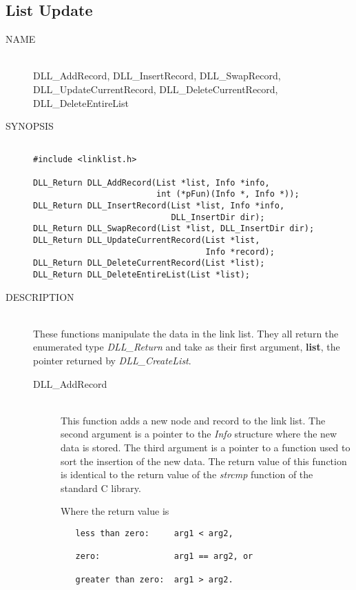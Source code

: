 \documentclass[10pt,letterpaper,titlepage]{article}
\begin{document}
\subsection{List Update}
\begin{description}
\item[NAME]\quad\\
DLL\_AddRecord, DLL\_InsertRecord, DLL\_SwapRecord,\\
DLL\_UpdateCurrentRecord, DLL\_DeleteCurrentRecord,\\
DLL\_DeleteEntireList

\item[SYNOPSIS]
\begin{verbatim}

#include <linklist.h>

DLL_Return DLL_AddRecord(List *list, Info *info,
                         int (*pFun)(Info *, Info *));
DLL_Return DLL_InsertRecord(List *list, Info *info,
                            DLL_InsertDir dir);
DLL_Return DLL_SwapRecord(List *list, DLL_InsertDir dir);
DLL_Return DLL_UpdateCurrentRecord(List *list,
                                   Info *record);
DLL_Return DLL_DeleteCurrentRecord(List *list);
DLL_Return DLL_DeleteEntireList(List *list);
\end{verbatim}

\item[DESCRIPTION]\quad\\
These functions manipulate the data in the link list.  They all return the enumerated type \emph{DLL\_Return} and take as their first argument, \textbf{list}, the pointer returned by \emph{DLL\_CreateList}.

\begin{description}
\item[DLL\_AddRecord]\quad\\
 This function adds a new node and record to the link list.  The second argument is a pointer to the \emph{Info} structure where the new data is stored.  The third argument is a pointer to a function used to sort the insertion of the new data.  The return value of this function is identical to the return value of the \emph{strcmp} function of the standard C library.
\vspace{8pt}

 Where the return value is
\begin{verbatim}
   less than zero:     arg1 < arg2,

   zero:               arg1 == arg2, or

   greater than zero:  arg1 > arg2.
\end{verbatim}


\end{description}
\end{description}
\end{document}
